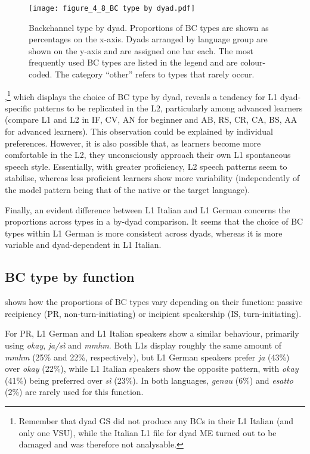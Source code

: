 \begin{figure}[p]
\texttt{[image: figure\_4\_8\_BC type by dyad.pdf]}
\caption{Backchannel type by dyad. Proportions of BC types are shown as percentages on the x-axis. Dyads arranged by language group are shown on the y-axis and are assigned one bar each. The most frequently used BC types are listed in the legend and are colour-coded. The category “other” refers to types that rarely occur.}
\label{fig:4.8}
\end{figure}
,\footnote{Remember that dyad GS did not produce any BCs in their L1 Italian (and only one VSU), while the Italian L1 file for dyad ME turned out to be damaged and was therefore not analysable.} which displays the choice of BC type by dyad, reveals a tendency for L1 dyad-specific patterns to be replicated in the L2, particularly among advanced learners (compare L1 and L2 in IF, CV, AN for beginner and AB, RS, CR, CA, BS, AA for advanced learners). This observation could be explained by individual preferences. However, it is also possible that, as learners become more comfortable in the L2, they unconsciously approach their own L1 spontaneous speech style. Essentially, with greater proficiency, L2 speech patterns seem to stabilise, whereas less proficient learners show more variability (independently of the model pattern being that of the native or the target language).

Finally, an evident difference between L1 Italian and L1 German concerns the proportions across types in a by-dyad comparison. It seems that the choice of BC types within L1 German is more consistent across dyads, whereas it is more variable and dyad-dependent in L1 Italian.



\subsection{BC type by function}
\label{sec:4.3.5}
 shows how the proportions of BC types vary depending on their function: passive recipiency (PR, non-turn-initiating) or incipient speakership (IS, turn-initiating).

For PR, L1 German and L1 Italian speakers show a similar behaviour, primarily using \textit{okay}, \textit{ja/sì} and \textit{mmhm}. Both L1s display roughly the same amount of \textit{mmhm} (25\% and 22\%, respectively), but L1 German speakers prefer \textit{ja} (43\%) over \textit{okay} (22\%), while L1 Italian speakers show the opposite pattern, with \textit{okay} (41\%) being preferred over \textit{sì} (23\%). In both languages, \textit{genau} (6\%) and \textit{esatto} (2\%) are rarely used for this function.

